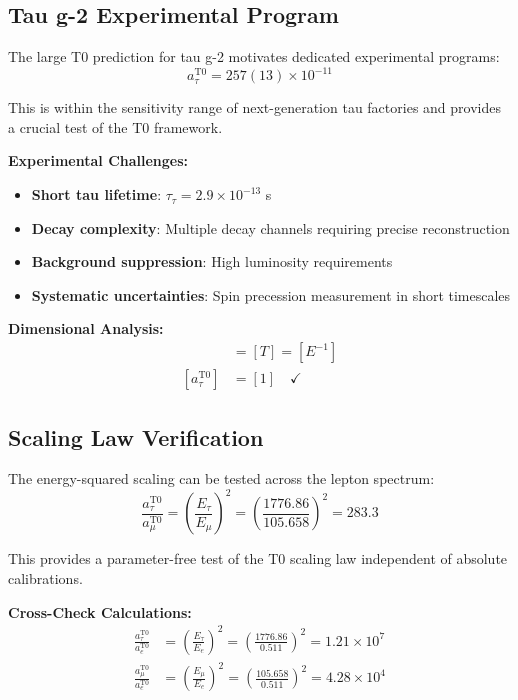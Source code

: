 \documentclass[12pt,a4paper]{report}
\begin{document}
\subsection{Tau g-2 Experimental Program}
\label{subsec:tau_g2_program}

The large T0 prediction for tau g-2 motivates dedicated experimental programs:
\begin{equation}
	a_\tau^{\text{T0}} = 257(13) \times 10^{-11}
\end{equation}

This is within the sensitivity range of next-generation tau factories and provides a crucial test of the T0 framework.

\textbf{Experimental Challenges:}
\begin{itemize}
	\item \textbf{Short tau lifetime}: $\tau_\tau = 2.9 \times 10^{-13}$ s
	\item \textbf{Decay complexity}: Multiple decay channels requiring precise reconstruction
	\item \textbf{Background suppression}: High luminosity requirements
	\item \textbf{Systematic uncertainties}: Spin precession measurement in short timescales
\end{itemize}

\textbf{Dimensional Analysis:}
\begin{align}
	[\tau_\tau] &= [T] = [E^{-1}] \\
	[a_\tau^{\text{T0}}] &= [1] \quad \checkmark
\end{align}

\subsection{Scaling Law Verification}
\label{subsec:scaling_verification}

The energy-squared scaling can be tested across the lepton spectrum:
\begin{equation}
	\frac{a_\tau^{\text{T0}}}{a_\mu^{\text{T0}}} = \left(\frac{E_\tau}{E_\mu}\right)^2 = \left(\frac{1776.86}{105.658}\right)^2 = 283.3
\end{equation}

This provides a parameter-free test of the T0 scaling law independent of absolute calibrations.

\textbf{Cross-Check Calculations:}
\begin{align}
	\frac{a_\tau^{\text{T0}}}{a_e^{\text{T0}}} &= \left(\frac{E_\tau}{E_e}\right)^2 = \left(\frac{1776.86}{0.511}\right)^2 = 1.21 \times 10^{7} \\
	\frac{a_\mu^{\text{T0}}}{a_e^{\text{T0}}} &= \left(\frac{E_\mu}{E_e}\right)^2 = \left(\frac{105.658}{0.511}\right)^2 = 4.28 \times 10^{4}
\end{align}
\end{document}
